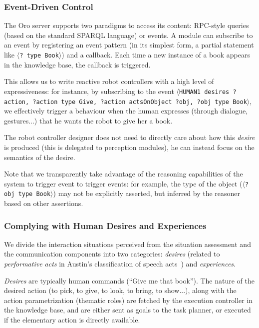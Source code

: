 \documentclass[preprint,3p,times]{elsarticle}
\newcommand{\stmt}[1]{{\footnotesize\tt$\langle$#1\relax$\rangle$}}
\begin{document}
\subsubsection{Event-Driven Control}
\label{events}

The {\sc Oro} server supports two paradigms to access its content: RPC-style
queries (based on the standard SPARQL language) or events. A module can
subscribe to an event by registering an event pattern (in its simplest
form, a partial statement like \stmt{? type Book}) and a callback.  Each
time a new instance of a book appears in the knowledge base, the callback is
triggered.

This allows us to write reactive robot controllers with a high level of
expressiveness: for instance, by subscribing to the event \stmt{HUMAN1 desires
?action, ?action type Give, ?action actsOnObject ?obj, ?obj type Book}, we
effectively trigger a behaviour when the human expresses (through dialogue,
gestures...) that he wants the robot to give her a book.

The robot controller designer does not need to directly care about how this
\emph{desire} is produced (this is delegated to perception modules), he can
instead focus on the semantics of the desire.

Note that we transparently take advantage of the reasoning capabilities of the
system to trigger event to trigger events:
for example, the type of the object (\stmt{?obj type Book}) may not be
explicitly asserted, but inferred by the reasoner based on other assertions.

\subsubsection{Complying with Human Desires and Experiences}
\label{sect:desires}

We divide the interaction situations perceived from the situation assessment and
the communication components into two categories: \emph{desires} (related to
\emph{performative acts} in Austin's classification of speech
acts~\cite{Austin1962}) and \emph{experiences}.

\emph{Desires} are typically human commands (``Give me that book''). The nature of
the desired action (to pick, to give, to look, to bring, to show...), along with the action
parametrization (thematic roles) are fetched by the execution controller in the knowledge base, and
are either sent as goals to the task planner, or executed if the elementary
action is directly available.
\end{document}
